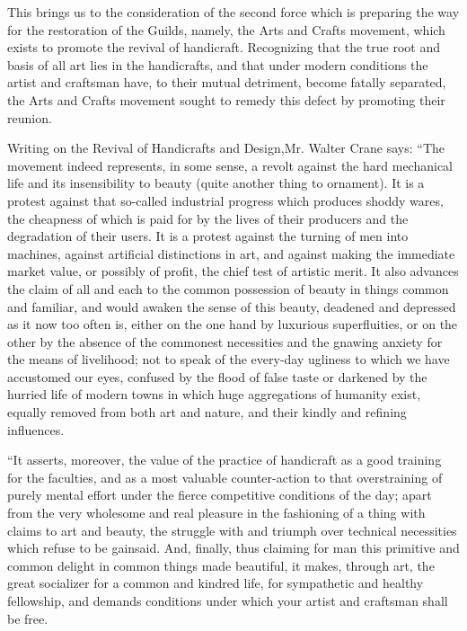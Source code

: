 \documentclass{book}
\begin{document}
This brings us to the consideration of the second force which is preparing the way for the restoration of the Guilds, namely, the Arts and Crafts movement, which exists to promote the revival of handicraft. Recognizing that the true root and basis of all art lies in the handicrafts, and that under modern conditions the artist and craftsman have, to their mutual detriment, become fatally separated, the Arts and Crafts movement sought to remedy this defect by promoting their reunion.

Writing on the Revival of Handicrafts and Design,\footnotemark[2] Mr. Walter Crane says: “The movement indeed represents, in some sense, a revolt against the hard mechanical life and its insensibility to beauty (quite another thing to ornament). It is a protest against that so-called industrial progress which produces shoddy wares, the cheapness of which is paid for by the lives of their producers and the degradation of their users. It is a protest against the turning of men into machines, against artificial distinctions in art, and against making the immediate market value, or possibly of profit, the chief test of artistic merit. It also advances the claim of all and each to the common possession of beauty in things common and familiar, and would awaken the sense of this beauty, deadened and depressed as it now too often is, either on the one hand by luxurious superfluities, or on the other by the absence of the commonest necessities and the gnawing anxiety for the means of livelihood; not to speak of the every-day ugliness to which we have accustomed our eyes, confused by the flood of false taste or darkened by the hurried life of modern towns in which huge aggregations of humanity exist, equally removed from both art and nature, and their kindly and refining influences.

“It asserts, moreover, the value of the practice of handicraft as a good training for the faculties, and as a most valuable counter-action to that overstraining of purely mental effort under the fierce competitive conditions of the day; apart from the very wholesome and real pleasure in the fashioning of a thing with claims to art and beauty, the struggle with and triumph over technical necessities which refuse to be gainsaid. And, finally, thus claiming for man this primitive and common delight in common things made beautiful, it makes, through art, the great socializer for a common and kindred life, for sympathetic and healthy fellowship, and demands conditions under which your artist and craftsman shall be free.
\end{document}
